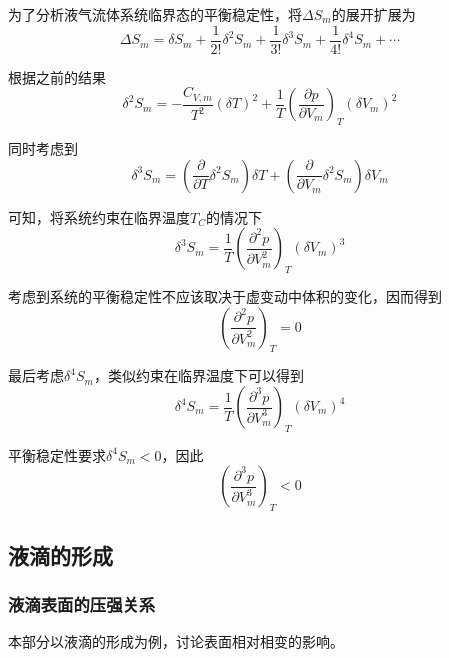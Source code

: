 \documentclass[UTF8]{ctexart}
\begin{document}
	为了分析液气流体系统临界态的平衡稳定性，将$ \Delta S_{m} $的展开扩展为
	\begin{equation}
	\Delta S_{m}=\delta S_{m}+\frac{1}{2 !} \delta^{2} S_{m}+\frac{1}{3 !} \delta^{3} S_{m}+\frac{1}{4 !} \delta^{4} S_{m}+\cdots
	\end{equation}
	
\noindent 根据之前的结果
\begin{equation}
\delta^{2} S_{m}=-\frac{C_{V, m}}{T^{2}}(\delta T)^{2}+\frac{1}{T}\left(\frac{\partial p}{\partial V_{m}}\right)_{T}\left(\delta V_{m}\right)^{2}
\end{equation}

\noindent 同时考虑到
\begin{equation}
\delta^{3} S_{m}=\left(\frac{\partial}{\partial T} \delta^{2} S_{m}\right) \delta T+\left(\frac{\partial}{\partial V_{m}} \delta^{2} S_{m}\right) \delta V_{m}
\end{equation}

\noindent 可知，将系统约束在临界温度$ T_{C} $的情况下
\begin{equation}
\delta^{3} S_{m}=\frac{1}{T}\left(\frac{\partial^{2} p}{\partial V_{m}^{2}}\right)_{T}\left(\delta V_{m}\right)^{3}
\end{equation}

\noindent 考虑到系统的平衡稳定性不应该取决于虚变动中体积的变化，因而得到
\begin{equation}
\left(\frac{\partial^{2} p}{\partial V_{m}^{2}}\right)_{T}=0
\end{equation}

\noindent 最后考虑$ \delta^{4} S_{m} $，类似约束在临界温度下可以得到
\begin{equation}
\delta^{4} S_{m}=\frac{1}{T}\left(\frac{\partial^{3} p}{\partial V_{m}^{3}}\right)_{T}\left(\delta V_{m}\right)^{4}
\end{equation}

\noindent 平衡稳定性要求$\delta^{4} S_{m}<0$，因此
\begin{equation}
\left(\frac{\partial^{3} p}{\partial V_{m}^{3}}\right)_{T}<0
\end{equation}

	\subsection{液滴的形成}
	\subsubsection{液滴表面的压强关系}
	本部分以液滴的形成为例，讨论表面相对相变的影响。
	
\end{document}
